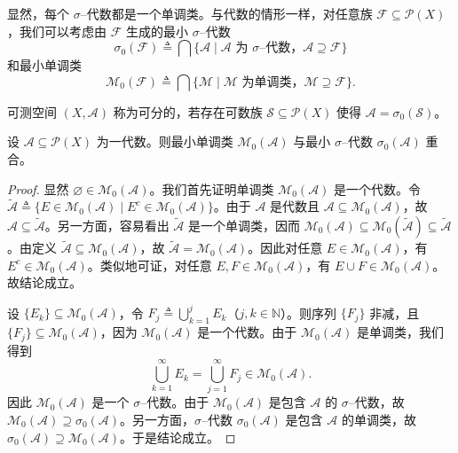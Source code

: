\documentclass[../../main.tex]{subfiles}%
\begin{document}
显然，每个 $\sigma$--代数都是一个单调类。与代数的情形一样，对任意族 $\mathcal{F}\subseteq\mathcal{P}(X)$，我们可以考虑由 $\mathcal{F}$ 生成的最小 $\sigma$--代数
\[
\sigma_0(\mathcal{F})\triangleq \bigcap\{\mathcal{A}\mid\mathcal{A}\text{ 为 }\sigma\text{--代数，}\mathcal{A}\supseteq\mathcal{F}\}
\]
和最小单调类
\[
\mathcal{M}_0(\mathcal{F})\triangleq \bigcap\{\mathcal{M}\mid\mathcal{M}\text{ 为单调类，}\mathcal{M}\supseteq\mathcal{F}\}.
\]

\begin{definition}\label{definition:ch01-可分可测空间}\label{definition:ch01-可分空间}
可测空间 $(X,\mathcal{A})$ 称为可分的，若存在可数族 $\mathcal{S}\subseteq\mathcal{P}(X)$ 使得 $\mathcal{A}=\sigma_0(\mathcal{S})$。
\end{definition}

\begin{theorem}\label{theorem:ch01-单调类定理}
设 $\mathcal{A}\subseteq\mathcal{P}(X)$ 为一代数。则最小单调类 $\mathcal{M}_0(\mathcal{A})$ 与最小 $\sigma$--代数 $\sigma_0(\mathcal{A})$ 重合。
\end{theorem}

\begin{proof}
显然 $\varnothing \in\mathcal{M}_0(\mathcal{A})$。我们首先证明单调类 $\mathcal{M}_0(\mathcal{A})$ 是一个代数。令 $\widetilde{\mathcal{A}}\triangleq \{E\in\mathcal{M}_0(\mathcal{A})\mid E^c\in\mathcal{M}_0(\mathcal{A})\}$。由于 $\mathcal{A}$ 是代数且 $\mathcal{A}\subseteq\mathcal{M}_0(\mathcal{A})$，故 $\mathcal{A}\subseteq\widetilde{\mathcal{A}}$。另一方面，容易看出 $\widetilde{\mathcal{A}}$ 是一个单调类，因而 $\mathcal{M}_0(\mathcal{A})\subseteq\mathcal{M}_0(\widetilde{\mathcal{A}})\subseteq\widetilde{\mathcal{A}}$。由定义 $\widetilde{\mathcal{A}}\subseteq\mathcal{M}_0(\mathcal{A})$，故 $\widetilde{\mathcal{A}}=\mathcal{M}_0(\mathcal{A})$。因此对任意 $E\in\mathcal{M}_0(\mathcal{A})$，有 $E^c\in\mathcal{M}_0(\mathcal{A})$。类似地可证，对任意 $E,F\in\mathcal{M}_0(\mathcal{A})$，有 $E\cup F\in\mathcal{M}_0(\mathcal{A})$。故结论成立。

设 $\{E_k\}\subseteq\mathcal{M}_0(\mathcal{A})$，令 $F_j\triangleq \bigcup_{k=1}^j E_k$（$j,k\in\mathbb{N}$）。则序列 $\{F_j\}$ 非减，且 $\{F_j\}\subseteq\mathcal{M}_0(\mathcal{A})$，因为 $\mathcal{M}_0(\mathcal{A})$ 是一个代数。由于 $\mathcal{M}_0(\mathcal{A})$ 是单调类，我们得到
\[
\bigcup_{k=1}^\infty E_k=\bigcup_{j=1}^\infty F_j\in\mathcal{M}_0(\mathcal{A}).
\]
因此 $\mathcal{M}_0(\mathcal{A})$ 是一个 $\sigma$--代数。由于 $\mathcal{M}_0(\mathcal{A})$ 是包含 $\mathcal{A}$ 的 $\sigma$--代数，故 $\mathcal{M}_0(\mathcal{A})\supseteq\sigma_0(\mathcal{A})$。另一方面，$\sigma$--代数 $\sigma_0(\mathcal{A})$ 是包含 $\mathcal{A}$ 的单调类，故 $\sigma_0(\mathcal{A})\supseteq\mathcal{M}_0(\mathcal{A})$。于是结论成立。
\end{proof}
\end{document}
